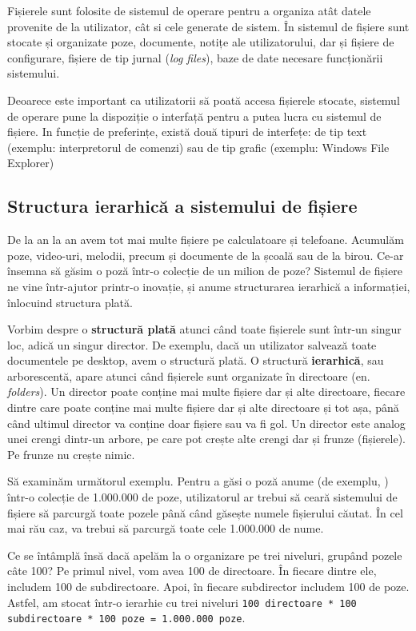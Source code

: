 Fișierele sunt folosite de sistemul de operare pentru a organiza atât
datele provenite de la utilizator, cât si cele generate de sistem. În sistemul de fișiere sunt stocate și organizate poze, documente, notițe ale utilizatorului, dar și fișiere de configurare, fișiere de tip jurnal (\textit{log files}), baze de date necesare funcționării sistemului.

Deoarece este important ca utilizatorii să poată accesa fișierele stocate,
sistemul de operare pune la dispoziție o interfață pentru a putea lucra cu
sistemul de fișiere. In funcție de preferințe, există două tipuri de interfețe:
de tip text (exemplu: interpretorul de comenzi) sau de tip grafic (exemplu:
Windows File Explorer)

\subsection{Structura ierarhică a sistemului de fișiere}
\label{sec:file-system-baza-struct}

De la an la an avem tot mai multe fișiere pe calculatoare și telefoane. Acumulăm
poze, video-uri, melodii, precum și documente de la școală sau de la birou.
Ce-ar însemna să găsim o poză într-o colecție de un milion de poze? Sistemul de
fișiere ne vine într-ajutor printr-o inovație, și anume structurarea ierarhică a
informației, înlocuind structura plată.

Vorbim despre o \textbf{structură plată} atunci când toate fișierele sunt
într-un singur loc, adică un singur director. De exemplu, dacă un utilizator
salvează toate documentele pe desktop, avem o structură plată. O structură
\textbf{ierarhică}, sau arborescentă, apare atunci când fișierele sunt
organizate în directoare (en. \textit{folders}). Un director poate conține mai
multe fișiere dar și alte directoare, fiecare dintre care poate conține mai
multe fișiere dar și alte directoare și tot așa, până când ultimul director va
conține doar fișiere sau va fi gol. Un director este analog unei crengi dintr-un
arbore, pe care pot crește alte crengi dar și frunze (fișierele). Pe frunze nu
crește nimic.

Să examinăm următorul exemplu. Pentru a găsi o poză anume (de exemplu,
) într-o colecție de 1.000.000 de poze, utilizatorul
ar trebui să ceară sistemului de fișiere să parcurgă toate pozele până când
găsește numele fișierului căutat. În cel mai rău caz, va trebui să parcurgă
toate cele 1.000.000 de nume.

Ce se întâmplă însă dacă apelăm la o organizare pe trei niveluri, grupând pozele
câte 100? Pe primul nivel, vom avea 100 de directoare. În fiecare dintre ele,
includem 100 de subdirectoare. Apoi, în fiecare subdirector includem 100 de
poze. Astfel, am stocat într-o ierarhie cu trei niveluri \texttt{100 directoare * 100 subdirectoare * 100 poze = 1.000.000 poze}.


